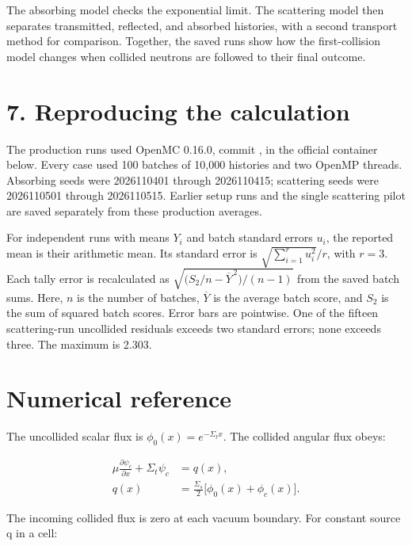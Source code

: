 \documentclass[10pt,letterpaper]{article}
\begin{document}
The absorbing model checks the exponential limit. The scattering model then separates transmitted, reflected, and absorbed histories, with a second transport method for comparison. Together, the saved runs show how the first-collision model changes when collided neutrons are followed to their final outcome.


\clearpage

\section*{7. Reproducing the calculation}

The production runs used OpenMC 0.16.0, commit , in the official container below. Every case used 100 batches of 10,000 histories and two OpenMP threads. Absorbing seeds were 2026110401 through 2026110415; scattering seeds were 2026110501 through 2026110515. Earlier setup runs and the single scattering pilot are saved separately from these production averages.




For independent runs with means \(Y_i\) and batch standard errors \(u_i\), the reported mean is their arithmetic mean. Its standard error is \(\sqrt{\sum_{i=1}^{r}u_i^2}/r\), with \(r=3\). Each tally error is recalculated as \(\sqrt{\bigl(S_2/n-\overline Y^{\,2}\bigr)/(n-1)}\) from the saved batch sums. Here, \(n\) is the number of batches, \(\overline Y\) is the average batch score, and \(S_2\) is the sum of squared batch scores. Error bars are pointwise. One of the fifteen scattering-run uncollided residuals exceeds two standard errors; none exceeds three. The maximum is 2.303.


\section*{Numerical reference}

The uncollided scalar flux is \(\phi_0(x)=e^{-\Sigma_t x}\). The collided angular flux obeys:


\begin{align}
\mu\frac{\partial\psi_c}{\partial x}+\Sigma_t\psi_c &= q(x),\\
q(x)&=\frac{\Sigma_s}{2}\bigl[\phi_0(x)+\phi_c(x)\bigr].
\end{align}

The incoming collided flux is zero at each vacuum boundary. For constant source q in a cell:
\end{document}

